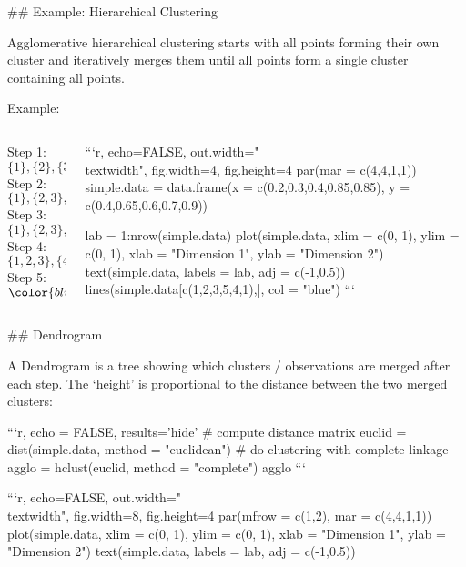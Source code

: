 ## Example: Hierarchical Clustering

\addtocounter{framenumber}{-1}

Agglomerative hierarchical clustering starts with all points forming their own cluster and iteratively merges them until all points form a single cluster containing all points.

Example:

\begin{columns}

\begin{column}{0.5\textwidth}
Step 1: $\{1\},\{2\},\{3\},\{4\},\{5\}$\\
Step 2: $\{1\},\{2,3\},\{4\},\{5\}$ \\
Step 3: $\{1\},\{2,3\},\{4,5\}$\\
Step 4: $\{1,2,3\},\{4,5\}$\\
Step 5: ${\color{blue}\{1,2,3,4,5\}}$
\end{column}
\begin{column}{0.4\textwidth}

```{r, echo=FALSE, out.width="\\textwidth", fig.width=4, fig.height=4}
par(mar = c(4,4,1,1))
simple.data = data.frame(x = c(0.2,0.3,0.4,0.85,0.85),
  y = c(0.4,0.65,0.6,0.7,0.9))

lab = 1:nrow(simple.data)
plot(simple.data, xlim = c(0, 1), ylim = c(0, 1), xlab = "Dimension 1", ylab = "Dimension 2")
text(simple.data, labels = lab, adj = c(-1,0.5))
lines(simple.data[c(1,2,3,5,4,1),], col = "blue")
```

\end{column}
\end{columns}

## Dendrogram

A Dendrogram is a tree showing which clusters / observations are merged after each step.
The `height' is proportional to the distance between the two merged clusters:

```{r, echo = FALSE, results='hide'}
# compute distance matrix
euclid = dist(simple.data, method = "euclidean")
# do clustering with complete linkage
agglo = hclust(euclid, method = "complete")
agglo
```

```{r, echo=FALSE, out.width="\\textwidth", fig.width=8, fig.height=4}
par(mfrow = c(1,2), mar = c(4,4,1,1))
plot(simple.data, xlim = c(0, 1), ylim = c(0, 1), xlab = "Dimension 1", ylab = "Dimension 2")
text(simple.data, labels = lab, adj = c(-1,0.5))

